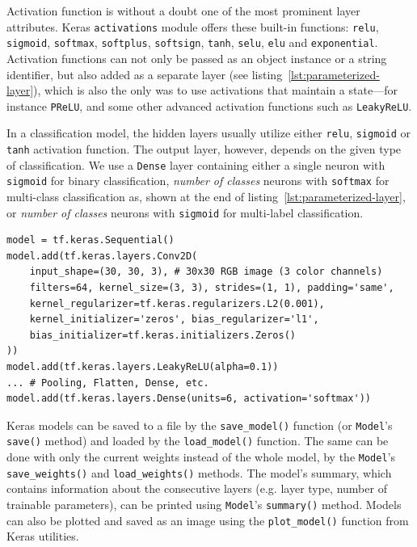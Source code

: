 Activation function is without a doubt one of the most prominent layer attributes.
Keras \texttt{activations} module offers these built-in functions: \texttt{relu}, \texttt{sigmoid}, \texttt{softmax},
\texttt{softplus}, \texttt{softsign}, \texttt{tanh}, \texttt{selu}, \texttt{elu}
and \texttt{exponential}. Activation functions can not only be passed as an object instance or a string
identifier, but also added as a separate layer (see listing~\ref{lst:parameterized-layer}),
which is also the only was to use activations that maintain a state---for instance \texttt{PReLU},
and some other advanced activation functions such as \texttt{LeakyReLU}.

In a classification model, the hidden layers usually utilize either \texttt{relu},
\texttt{sigmoid} or \texttt{tanh} activation function. The output layer, however, depends on the given type
of classification. We use a \texttt{Dense} layer containing either a single neuron with \texttt{sigmoid}
for binary classification, \textit{number of classes} neurons with \texttt{softmax}
for multi-class classification as, shown at the end of listing~\ref{lst:parameterized-layer},
or \textit{number of classes} neurons with \texttt{sigmoid} for multi-label classification.

\begin{lstlisting}[caption={A CNN six-class classification model with
specifically parameterized layers.}, label={lst:parameterized-layer}]
model = tf.keras.Sequential()
model.add(tf.keras.layers.Conv2D(
    input_shape=(30, 30, 3), # 30x30 RGB image (3 color channels)
    filters=64, kernel_size=(3, 3), strides=(1, 1), padding='same',
    kernel_regularizer=tf.keras.regularizers.L2(0.001),
    kernel_initializer='zeros', bias_regularizer='l1',
    bias_initializer=tf.keras.initializers.Zeros()
))
model.add(tf.keras.layers.LeakyReLU(alpha=0.1))
... # Pooling, Flatten, Dense, etc.
model.add(tf.keras.layers.Dense(units=6, activation='softmax'))
\end{lstlisting}

Keras models can be saved to a file by the \texttt{save\_model()} function (or \texttt{Model}'s \texttt{save()} method)
and loaded by the \texttt{load\_model()} function. The same can be done with only the current weights instead
of the whole model, by the \texttt{Model}'s \texttt{save\_weights()} and \texttt{load\_weights()} methods.
The model's summary, which contains information about the consecutive layers (e.g. layer type, number of
trainable parameters), can be printed using \texttt{Model}'s \texttt{summary()} method.
Models can also be plotted and saved as an image using the \texttt{plot\_model()} function from Keras utilities.





